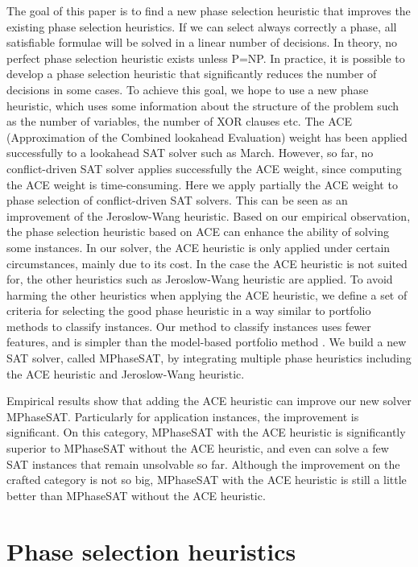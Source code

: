 \documentclass{llncs}
\begin{document}
\setlength{\parskip}{ 0.3ex} The goal of this paper is to find a new
phase selection heuristic that improves the existing phase selection
heuristics. If we can select always correctly a phase, all
satisfiable formulae will be solved in a linear number of decisions.
In theory, no perfect phase selection heuristic exists unless P=NP.
In practice, it is possible to develop a phase selection heuristic
that significantly reduces the number of decisions in some cases. To
achieve this goal, we hope to use a new phase heuristic, which uses
some information about the structure of the problem such as the
number of variables, the number of XOR clauses etc. The ACE
(Approximation of the Combined lookahead Evaluation) weight has been
applied successfully to a lookahead SAT solver such as March.
However,  so far, no conflict-driven SAT solver applies successfully
the ACE weight, since computing the ACE weight is time-consuming.
Here we apply partially the ACE weight to phase selection of
conflict-driven SAT solvers. This can be seen as an improvement of
the Jeroslow-Wang heuristic. Based on our empirical observation, the
phase selection heuristic based on ACE can enhance the ability of
solving some instances. In our solver, the ACE heuristic is only
applied under certain circumstances, mainly due to its cost. In the
case the ACE heuristic is not suited for, the other heuristics such
as Jeroslow-Wang heuristic are applied. To avoid harming the other
heuristics when applying the ACE heuristic, we define a set of
criteria for selecting the good phase heuristic in a way similar to
portfolio methods \cite
{borgsat:7,Portfolio:8,XuA:9,XuB:10,XuSovler:11} to classify
instances. Our method to classify instances uses fewer features, and
is simpler than the model-based portfolio method \cite{Portfolio:8}.
We build a new SAT solver, called MPhaseSAT, by integrating multiple
phase heuristics including the ACE heuristic and Jeroslow-Wang
heuristic.

  Empirical results show that adding the ACE heuristic can improve
our new solver MPhaseSAT. Particularly for application instances,
the improvement is significant. On this category, MPhaseSAT with the
ACE heuristic is significantly superior to MPhaseSAT without the ACE
heuristic, and even can solve a few SAT instances that remain
unsolvable so far. Although the improvement on the crafted category
is not so big, MPhaseSAT with the ACE heuristic is still a little
better than MPhaseSAT without the ACE heuristic.
\section{Phase selection heuristics}
\end{document}
